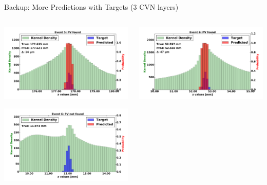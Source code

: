 \begin{frame}{Backup: More Predictions with Targets (3 CVN layers)}
  \begin{columns}[c]
        \begin{center}
            \includegraphics[width=1\textwidth,height=0.45\textwidth, trim=18 0 18 0]{images/120000_3layer_36.pdf}
    
            \includegraphics[width=1\textwidth, height=0.45\textwidth,trim=18 0 18 0]{images/120000_3layer_37.pdf}

        \end{center}
        \begin{center}
           \includegraphics[width=1\textwidth, height=0.45\textwidth, trim=18 0 18 0]{images/120000_3layer_38.pdf}
    

\end{center}
\end{columns}
\end{frame}
